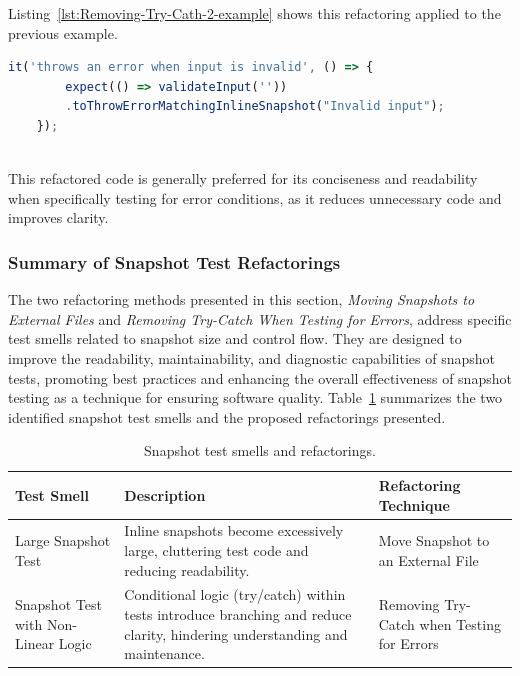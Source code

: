 \documentclass[
	msc, %
	english %
]{../ppgccufmg}
\begin{document}
        Listing~\ref{lst:Removing-Try-Cath-2-example} shows this refactoring applied to the previous example.
        
        \begin{lstlisting}[language=javascript, caption=Snapshot test after applying removing try-catch when testing
 for errors, label=lst:Removing-Try-Cath-2-example]
    it('throws an error when input is invalid', () => {
        expect(() => validateInput(''))
        .toThrowErrorMatchingInlineSnapshot("Invalid input");
    });
                
        \end{lstlisting}

        This refactored code is generally preferred for its conciseness and readability when specifically testing for error conditions, as it reduces unnecessary code and improves clarity.

        \subsubsection{Summary of Snapshot Test Refactorings} 
        
        The two refactoring methods presented in this section, \textit{Moving Snapshots to External Files} and \textit{Removing Try-Catch When Testing for Errors}, address specific test smells related to snapshot size and control flow. They are designed to improve the readability, maintainability, and diagnostic capabilities of snapshot tests, promoting best practices and enhancing the overall effectiveness of snapshot testing as a technique for ensuring software quality. Table~\ref{tab:snapshot_test_smells_refactorings} summarizes the two identified snapshot test smells and the proposed refactorings presented.

        \hspace{1pt}
        \begin{table}[!ht]
        \centering
        \begin{tabular}{p{3cm}p{7cm}p{4cm}}
            \toprule
            \textbf{Test Smell} & \textbf{Description} & \textbf{Refactoring Technique} \\
            \midrule
            Large Snapshot Test & Inline snapshots become excessively large, cluttering test code and reducing readability. & Move Snapshot to an External File \\
            \midrule
            Snapshot Test with Non-Linear Logic & Conditional logic (try/catch) within tests introduce branching and reduce clarity, hindering understanding and maintenance. & Removing Try-Catch when Testing for Errors \\
            \bottomrule
        \end{tabular}
        \caption{Snapshot test smells and refactorings.}
        \label{tab:snapshot_test_smells_refactorings}
        \end{table}
\end{document}
